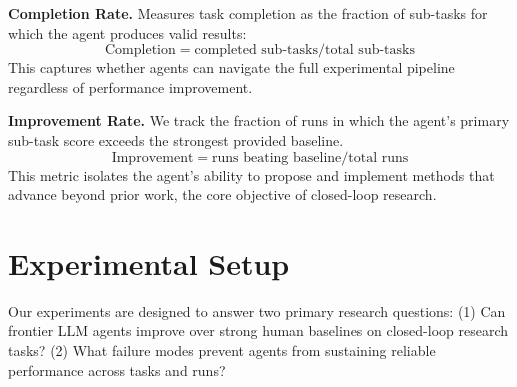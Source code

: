 \documentclass[11pt]{article}
\theoremstyle{plain}
\theoremstyle{definition}
\theoremstyle{remark}
\begin{document}
\textbf{Completion Rate.}
Measures task completion as the fraction of sub-tasks for which the agent produces valid results:
\begin{equation}
\text{Completion} = \text{completed sub-tasks}/\text{total sub-tasks}
\end{equation}
This captures whether agents can navigate the full experimental pipeline regardless of performance improvement. 


\textbf{Improvement Rate.}
We track the fraction of runs in which the agent's primary sub-task score exceeds the strongest provided baseline.
\begin{equation}
\text{Improvement} = \text{runs beating baseline}/\text{total runs}
\end{equation}
This metric isolates the agent's ability to propose and implement methods that advance beyond prior work, the core objective of closed-loop research.





\section{Experimental Setup} \label{exp-setup}

Our experiments are designed to answer two primary research questions: (1) Can frontier LLM agents improve over strong human baselines on closed-loop research tasks? (2) What failure modes prevent agents from sustaining reliable performance across tasks and runs?
\end{document}
